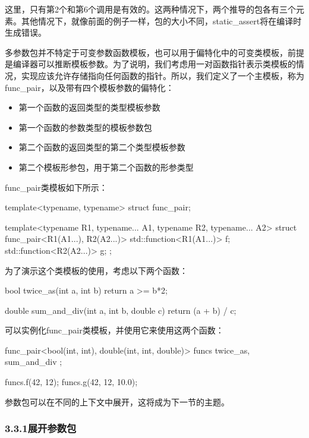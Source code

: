 这里，只有第2个和第6个调用是有效的。这两种情况下，两个推导的包各有三个元素。其他情况下，就像前面的例子一样，包的大小不同，static\_assert将在编译时生成错误。

多参数包并不特定于可变参数函数模板，也可以用于偏特化中的可变类模板，前提是编译器可以推断模板参数。为了说明，我们考虑用一对函数指针表示类模板的情况，实现应该允许存储指向任何函数的指针。所以，我们定义了一个主模板，称为func\_pair，以及带有四个模板参数的偏特化：

\begin{itemize}
\item
第一个函数的返回类型的类型模板参数

\item
第一个函数的参数类型的模板参数包

\item
第二个函数的返回类型的第二个类型模板参数

\item
第二个模板形参包，用于第二个函数的形参类型
\end{itemize}

func\_pair类模板如下所示：

\begin{cpp}
template<typename, typename>
struct func_pair;

template<typename R1, typename... A1,
         typename R2, typename... A2>
struct func_pair<R1(A1...), R2(A2...)>
{
	std::function<R1(A1...)> f;
	std::function<R2(A2...)> g;
};
\end{cpp}

为了演示这个类模板的使用，考虑以下两个函数：

\begin{cpp}
bool twice_as(int a, int b)
{
	return a >= b*2;
}

double sum_and_div(int a, int b, double c)
{
	return (a + b) / c;
}
\end{cpp}

可以实例化func\_pair类模板，并使用它来使用这两个函数：

\begin{cpp}
func_pair<bool(int, int), double(int, int, double)> funcs{
	twice_as, sum_and_div };

funcs.f(42, 12);
funcs.g(42, 12, 10.0);
\end{cpp}

参数包可以在不同的上下文中展开，这将成为下一节的主题。

\subsubsection{3.3.1\hspace{0.2cm}展开参数包}

